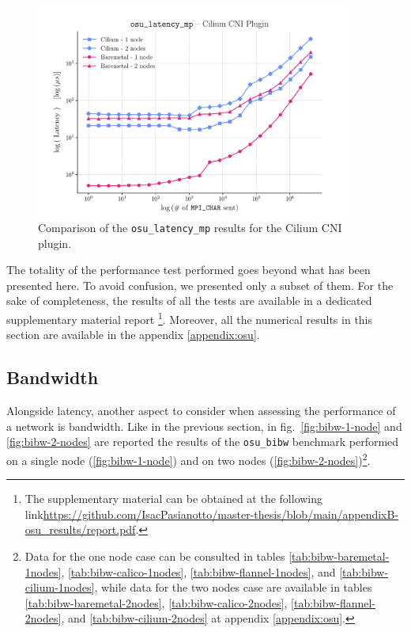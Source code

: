 \begin{figure}
  \centering
  \includegraphics[width=0.94\textwidth]{img/chpt3/cilium-latency_mp}
  \caption{Comparison of the \texttt{osu\_latency\_mp} results for the Cilium
    CNI plugin.}
  \label{fig:cilium-latency}
\end{figure}

The totality of the performance test performed goes beyond what has been
presented here. To avoid confusion, we presented only a subset of them. For the
sake of completeness, the results of all the tests are available in a dedicated
supplementary material report \footnote{ The supplementary material can be
obtained at the following
link\url{https://github.com/IsacPasianotto/master-thesis/blob/main/appendixB-osu_results/report.pdf}.}.
Moreover, all the numerical results in this section are available in the
appendix \ref{appendix:osu}.

\clearpage

\subsection{Bandwidth}\label{subsec:results-bandwidth}

Alongside latency, another aspect to consider when assessing the performance of
a network is bandwidth. Like in the previous section, in
fig.~\ref{fig:bibw-1-node} and \ref{fig:bibw-2-nodes} are reported the results
of the \texttt{osu\_bibw} benchmark performed on a single node
(\ref{fig:bibw-1-node}) and on two nodes (\ref{fig:bibw-2-nodes})\footnote{Data
for the one node case can be consulted in tables
\ref{tab:bibw-baremetal-1nodes}, \ref{tab:bibw-calico-1nodes},
\ref{tab:bibw-flannel-1nodes}, and \ref{tab:bibw-cilium-1nodes}, while data for
the two nodes case are available in tables \ref{tab:bibw-baremetal-2nodes},
\ref{tab:bibw-calico-2nodes}, \ref{tab:bibw-flannel-2nodes}, and
\ref{tab:bibw-cilium-2nodes} at appendix \ref{appendix:osu}.}.

